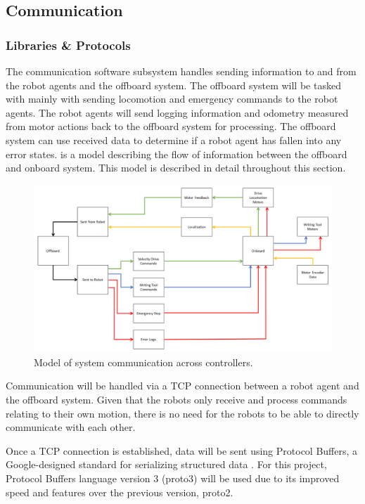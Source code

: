 
\subsection{Communication}
\label{sec:software_comm}


\subsubsection{Libraries \& Protocols}
\label{sec:software_comm_libs}
The communication software subsystem handles sending information to and from the robot agents and the offboard system. The offboard system will be tasked with mainly with sending locomotion and emergency commands to the robot agents. The robot agents will send logging information and odometry measured from motor actions back to the offboard system for processing. The offboard system can use received data to determine if a robot agent has fallen into any error states.  is a model describing the flow of information between the offboard and onboard system. This model is described in detail throughout this section.

\begin{figure}
\centering
\includegraphics[width=0.9\columnwidth]{figs/sw_arch_communication.png}
\caption{Model of system communication across controllers.}
\label{fig:software_comm_model}
\end{figure}

Communication will be handled via a TCP connection between a robot agent and the offboard system. Given that the robots only receive and process commands relating to their own motion, there is no need for the robots to be able to directly communicate with each other. 

Once a TCP connection is established, data will be sent using Protocol Buffers, a Google-designed standard for serializing structured data \cite{protobuf3}. For this project, Protocol Buffers language version 3 (proto3) will be used due to its improved speed and features over the previous version, proto2.

